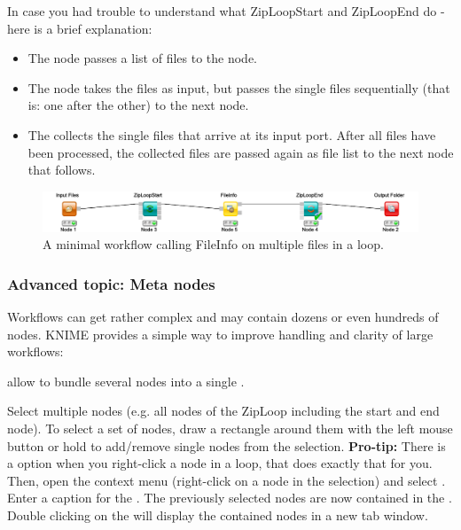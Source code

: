 In case you had trouble to understand what ZipLoopStart and ZipLoopEnd do - here is a brief explanation:
\begin{itemize}
\item
The   node passes a list of files to the  node.
\item
The  node takes the files as input, but passes the single files sequentially (that is: one after the other) to the next node. 
\item
The  collects the single files that arrive at its input port. After all files have been processed, the collected files are passed again as file list to the next node that follows.
\end{itemize}

\begin{figure}
\centering
\includegraphics[width=\textwidth]{graphics/knime_setup/Minimal_FileInfoLoop}
\caption{A minimal workflow calling FileInfo on multiple files in a loop.}
\label{fig:knime_minimal_loop}
\end{figure}

\subsubsection{Advanced topic: Meta nodes}

Workflows can get rather complex and may contain dozens or even hundreds of nodes. KNIME provides a simple way to improve handling and clarity of large workflows:

 allow to bundle several nodes into a single .

\begin{task}
Select multiple nodes (e.g. all nodes of the ZipLoop including the start and end node). To select a set of nodes, draw a rectangle around them with the left mouse button or hold  to add/remove single nodes from the selection. \textbf{Pro-tip:} There is a  option when you right-click a node in a loop, that does exactly that for you. Then, open the context menu (right-click on a node in the selection) and select . Enter a caption for the . The previously selected nodes are now contained in the . Double clicking on the  will display the contained nodes in a new tab window. 
\end{task}


